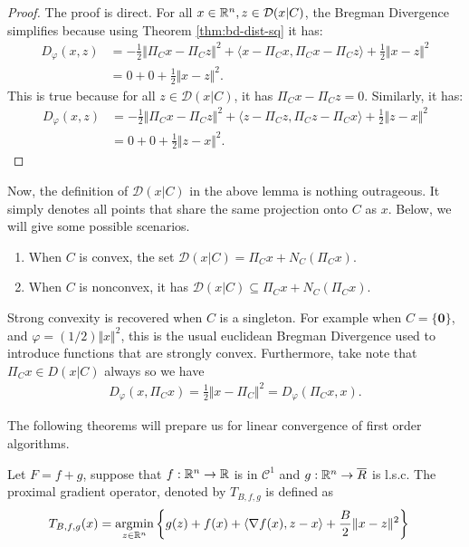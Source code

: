 \documentclass[12pt]{article}
\begin{document}
    \begin{proof}
        The proof is direct. 
        For all $x \in \mathbb R^n, z \in \mathcal D(x | C)$, the Bregman Divergence simplifies because using Theorem \ref{thm:bd-dist-sq} it has: 
        \begin{align*}
            D_\varphi (x, z) &= 
            - \frac{1}{2}\Vert \Pi_C x - \Pi_C z\Vert^2 
            + \langle x - \Pi_C x, \Pi_C x - \Pi_C z\rangle 
            + \frac{1}{2}\Vert x - z\Vert^2
            \\
            &= 0 + 0 + \frac{1}{2}\Vert x - z\Vert^2. 
        \end{align*}
        This is true because for all $z \in \mathcal D(x | C)$, it has $\Pi_C x - \Pi_C z = 0$. 
        Similarly, it has: 
        \begin{align*}
            D_\varphi(x, z) &= 
            - \frac{1}{2}\Vert \Pi_C x - \Pi_C z\Vert^2 
            + \langle z - \Pi_C z, \Pi_C z - \Pi_C x\rangle
            + \frac{1}{2}\Vert z - x\Vert^2
            \\
            &= 0 + 0 + \frac{1}{2}\Vert z - x\Vert^2. 
        \end{align*}
    \end{proof}
    \par
    Now, the definition of $\mathcal D(x | C)$ in the above lemma is nothing outrageous. 
    It simply denotes all points that share the same projection onto $C$ as $x$. 
    Below, we will give some possible scenarios. 
    \begin{enumerate}
        \item When $C$ is convex, the set $\mathcal D(x | C) = \Pi_C x + N_C(\Pi_C x)$. 
        \item When $C$ is nonconvex, it has $\mathcal D(x | C) \subseteq \Pi_C x + N_C(\Pi_C x)$. 
    \end{enumerate}
    Strong convexity is recovered when $C$ is a singleton. 
    For example when $C = \{\mathbf 0\}$, and $\varphi = (1/2)\Vert x\Vert^2$, this is the usual euclidean Bregman Divergence used to introduce functions that are strongly convex. 
    Furthermore, take note that $\Pi_C x \in D(x | C)$ always so we have
    \begin{align}
        D_\varphi(x, \Pi_C x) = \frac{1}{2}\Vert x - \Pi_C \Vert^2 = D_\varphi(\Pi_C x, x). 
    \end{align}
    \par
    The following theorems will prepare us for linear convergence of first order algorithms. 
    \begin{definition}\label{def:pg}
        Let $F = f + g$, suppose that $f : \mathbb R^n \rightarrow \mathbb R$ is in $\mathcal C^1$ and $g: \mathbb R^n \rightarrow \overline R$ is l.s.c. 
        The proximal gradient operator, denoted by $T_{B, f, g}$ is defined as
        \begin{align*}
            T_{B, f, g}(x) &= \mathop{\rm argmin}\limits_{z\in \mathbb R^n} \left\lbrace
                g(z) + f(x) + \langle \nabla f(x), z - x\rangle + \frac{B}{2}\Vert x - z\Vert^2
            \right\rbrace
        \end{align*}
    \end{definition}
\end{document}
